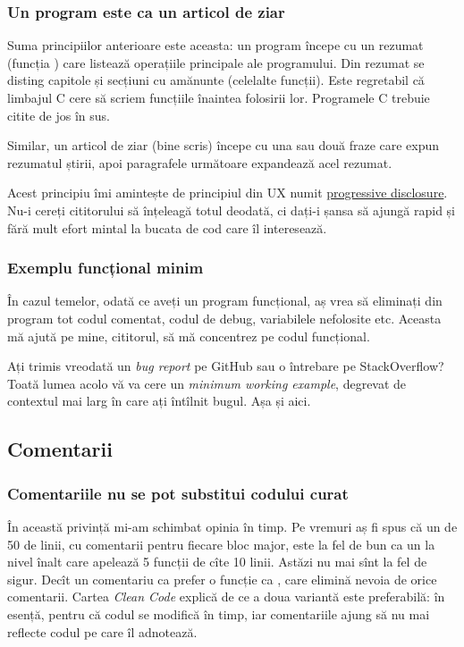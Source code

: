 \documentclass[../main.tex]{subfiles}
\begin{document}
\subsubsection*{Un program este ca un articol de ziar}

Suma principiilor anterioare este aceasta:  un program începe cu un rezumat (funcția ) care listează operațiile principale ale programului. Din rezumat se disting capitole și secțiuni cu amănunte (celelalte funcții). Este regretabil că limbajul C cere să scriem funcțiile înaintea folosirii lor. Programele C trebuie citite de jos în sus.

Similar, un articol de ziar (bine scris) începe cu una sau două fraze care expun rezumatul știrii, apoi paragrafele următoare expandează acel rezumat.

Acest principiu îmi amintește de principiul din UX numit \href{https://en.wikipedia.org/wiki/Progressive_disclosure}{progressive disclosure}. Nu-i cereți cititorului să înțeleagă totul deodată, ci dați-i șansa să ajungă rapid și fără mult efort mintal la bucata de cod care îl interesează.

\subsubsection*{Exemplu funcțional minim}

În cazul temelor, odată ce aveți un program funcțional, aș vrea să  eliminați din program tot codul comentat, codul de debug, variabilele nefolosite etc. Aceasta mă ajută pe mine, cititorul, să mă concentrez pe codul funcțional.

Ați trimis vreodată un \textit{bug report} pe GitHub sau o întrebare pe StackOverflow? Toată lumea acolo vă va cere un \textit{minimum working example}, degrevat de contextul mai larg în care ați întîlnit bugul. Așa și aici.

\subsection{Comentarii}

\subsubsection*{Comentariile nu se pot substitui codului curat}

În această privință mi-am schimbat opinia în timp. Pe vremuri aș fi spus că un  de 50 de linii, cu comentarii pentru fiecare bloc major, este la fel de bun ca un  la nivel înalt care apelează 5 funcții de cîte 10 linii. Astăzi nu mai sînt la fel de sigur. Decît un comentariu ca  prefer o funcție ca , care elimină nevoia de orice comentarii. Cartea \textit{Clean Code} explică de ce a doua variantă este preferabilă: în esență, pentru că codul se modifică în timp, iar comentariile ajung să nu mai reflecte codul pe care îl adnotează.
\end{document}
